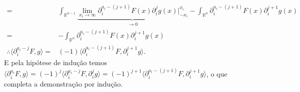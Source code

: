 \documentclass{article}
\begin{document}
\begin{enumerate}
$$\begin{aligned}
		\\
		= & \int_{\mathbb{R}^{n-1}} \underbrace{ \lim_{x_{i} \to \infty} \partial^{a_{i}-(j+1)}_{i}F(x)\partial^{j}_{i}g(x) \Big|^{x_{i}}_{-x_{i}} }_{\to 0} -  \int_{\mathbb{R}^{n}} \partial^{a_{i}-(j+1)}_{i}F(x) \partial^{j+1}_{i}g(x)
		\\
		= & - \int_{\mathbb{R}^{n}} \partial^{a_{i}-(j+1)}_{i}F(x) \partial^{j+1}_{i}g(x)
		\\
		\therefore \langle \partial^{a_{i}-j}_{i}F, g \rangle = & (-1)\langle \partial^{a_{i}-(j+1)}_{i}F, \partial^{j+1}_{i}g \rangle.
		\end{aligned}
		$$
		E pela hipótese de indução temos $\langle \partial^{a_{i}}_{i}F, g \rangle = (-1)^{j} \langle \partial^{a_{i}-j}_{i}F, \partial^{j}_{i}g \rangle = (-1)^{j+1}\langle \partial^{a_{i}-(j+1)}_{i}F, \partial^{j+1}_{i}g \rangle$, o que completa a demonstração por indução.
		

\end{enumerate}
\end{document}
